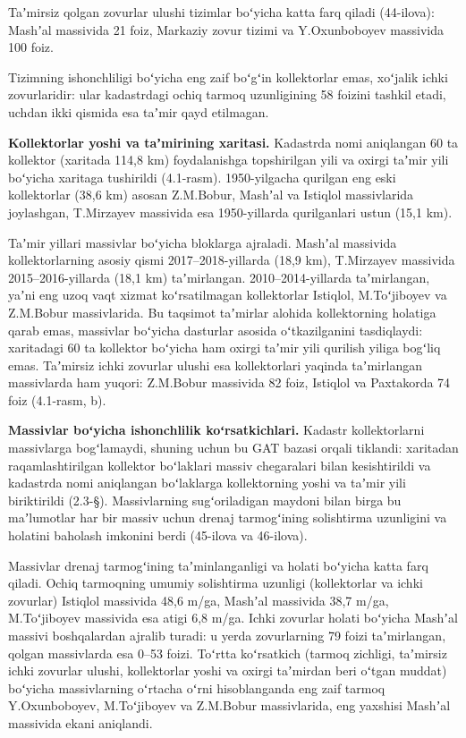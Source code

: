 Taʼmirsiz qolgan zovurlar ulushi tizimlar boʻyicha katta farq qiladi
(44-ilova): Mashʼal massivida 21 foiz, Markaziy zovur tizimi va
Y.Oxunboboyev massivida 100 foiz.

Tizimning ishonchliligi boʻyicha eng zaif boʻgʻin kollektorlar emas,
xoʻjalik ichki zovurlaridir: ular kadastrdagi ochiq tarmoq uzunligining
58 foizini tashkil etadi, uchdan ikki qismida esa taʼmir qayd etilmagan.

\textbf{Kollektorlar yoshi va taʼmirining xaritasi.} Kadastrda nomi
aniqlangan 60 ta kollektor (xaritada 114,8 km) foydalanishga
topshirilgan yili va oxirgi taʼmir yili boʻyicha xaritaga tushirildi
(4.1-rasm). 1950-yilgacha qurilgan eng eski kollektorlar (38,6 km)
asosan Z.M.Bobur, Mashʼal va Istiqlol massivlarida joylashgan,
T.Mirzayev massivida esa 1950-yillarda qurilganlari ustun (15,1 km).

Taʼmir yillari massivlar boʻyicha bloklarga ajraladi. Mashʼal massivida
kollektorlarning asosiy qismi 2017--2018-yillarda (18,9 km), T.Mirzayev
massivida 2015--2016-yillarda (18,1 km) taʼmirlangan.
2010--2014-yillarda taʼmirlangan, yaʼni eng uzoq vaqt xizmat
koʻrsatilmagan kollektorlar Istiqlol, M.Toʻjiboyev va Z.M.Bobur
massivlarida. Bu taqsimot taʼmirlar alohida kollektorning holatiga qarab
emas, massivlar boʻyicha dasturlar asosida oʻtkazilganini tasdiqlaydi:
xaritadagi 60 ta kollektor boʻyicha ham oxirgi taʼmir yili qurilish
yiliga bogʻliq emas. Taʼmirsiz ichki zovurlar ulushi esa kollektorlari
yaqinda taʼmirlangan massivlarda ham yuqori: Z.M.Bobur massivida 82
foiz, Istiqlol va Paxtakorda 74 foiz (4.1-rasm, b).



\textbf{Massivlar boʻyicha ishonchlilik koʻrsatkichlari.} Kadastr
kollektorlarni massivlarga bogʻlamaydi, shuning uchun bu GAT bazasi
orqali tiklandi: xaritadan raqamlashtirilgan kollektor boʻlaklari massiv
chegaralari bilan kesishtirildi va kadastrda nomi aniqlangan boʻlaklarga
kollektorning yoshi va taʼmir yili biriktirildi (2.3-§). Massivlarning
sugʻoriladigan maydoni bilan birga bu maʼlumotlar har bir massiv uchun
drenaj tarmogʻining solishtirma uzunligini va holatini baholash imkonini
berdi (45-ilova va 46-ilova).

Massivlar drenaj tarmogʻining taʼminlanganligi va holati boʻyicha katta
farq qiladi. Ochiq tarmoqning umumiy solishtirma uzunligi (kollektorlar
va ichki zovurlar) Istiqlol massivida 48,6 m/ga, Mashʼal massivida 38,7
m/ga, M.Toʻjiboyev massivida esa atigi 6,8 m/ga. Ichki zovurlar holati
boʻyicha Mashʼal massivi boshqalardan ajralib turadi: u yerda
zovurlarning 79 foizi taʼmirlangan, qolgan massivlarda esa 0--53 foizi.
Toʻrtta koʻrsatkich (tarmoq zichligi, taʼmirsiz ichki zovurlar ulushi,
kollektorlar yoshi va oxirgi taʼmirdan beri oʻtgan muddat) boʻyicha
massivlarning oʻrtacha oʻrni hisoblanganda eng zaif tarmoq
Y.Oxunboboyev, M.Toʻjiboyev va Z.M.Bobur massivlarida, eng yaxshisi
Mashʼal massivida ekani aniqlandi.

